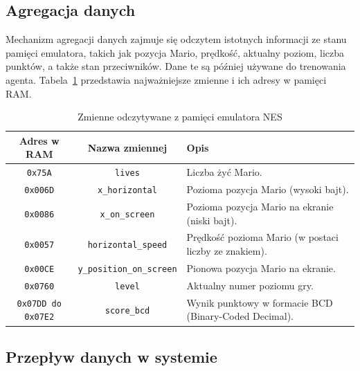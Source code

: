 \subsection{Agregacja danych}

Mechanizm agregacji danych zajmuje się odczytem istotnych informacji ze stanu pamięci emulatora, takich jak pozycja Mario, prędkość, aktualny poziom, liczba punktów, a także stan przeciwników. Dane te są później używane do trenowania agenta. Tabela~\ref{tab:nes_memory} przedstawia najważniejsze zmienne i ich adresy w pamięci RAM.

\begin{table}[ht]
	\centering
	\caption{Zmienne odczytywane z pamięci emulatora NES}
	\label{tab:nes_memory}
	\begin{tabular}{|c|c|p{5cm}|}
		\hline
		\textbf{Adres w RAM}      & \textbf{Nazwa zmiennej}          & \textbf{Opis}                                         \\ \hline
		\texttt{0x75A}            & \texttt{lives}                   & Liczba żyć Mario.                                     \\ \hline
		\texttt{0x006D}           & \texttt{x\_horizontal}           & Pozioma pozycja Mario (wysoki bajt).                  \\ \hline
		\texttt{0x0086}           & \texttt{x\_on\_screen}           & Pozioma pozycja Mario na ekranie (niski bajt).        \\ \hline
		\texttt{0x0057}           & \texttt{horizontal\_speed}       & Prędkość pozioma Mario (w postaci liczby ze znakiem). \\ \hline
		\texttt{0x00CE}           & \texttt{y\_position\_on\_screen} & Pionowa pozycja Mario na ekranie.                     \\ \hline
		\texttt{0x0760}           & \texttt{level}                   & Aktualny numer poziomu gry.                           \\ \hline
		\texttt{0x07DD do 0x07E2} & \texttt{score\_bcd}              & Wynik punktowy w formacie BCD (Binary-Coded Decimal). \\ \hline
	\end{tabular}
\end{table}
\subsection{Przepływ danych w systemie}

